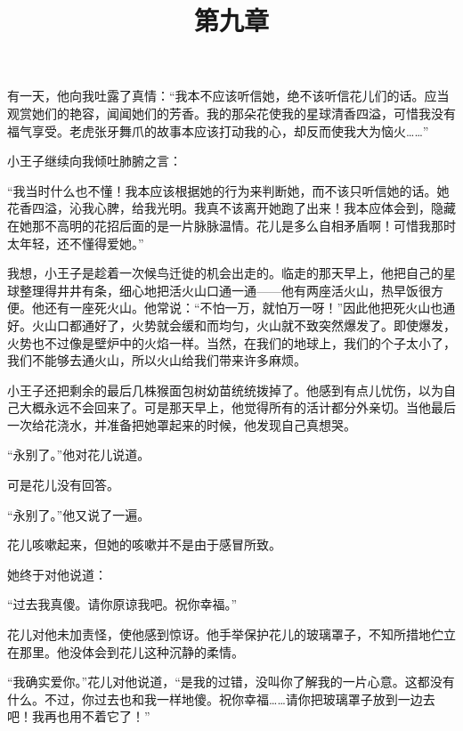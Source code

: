 有一天，他向我吐露了真情：“我本不应该听信她，绝不该听信花儿们的话。应当观赏她们的艳容，闻闻她们的芳香。我的那朵花使我的星球清香四溢，可惜我没有福气享受。老虎张牙舞爪的故事本应该打动我的心，却反而使我大为恼火\ldots{}\ldots{}”

小王子继续向我倾吐肺腑之言：

“我当时什么也不懂！我本应该根据她的行为来判断她，而不该只听信她的话。她花香四溢，沁我心脾，给我光明。我真不该离开她跑了出来！我本应体会到，隐藏在她那不高明的花招后面的是一片脉脉温情。花儿是多么自相矛盾啊！可惜我那时太年轻，还不懂得爱她。”

{\startalignment[center]
 \stopalignment}

\title{第九章}

{\startalignment[center]
 \stopalignment}

我想，小王子是趁着一次候鸟迁徙的机会出走的。临走的那天早上，他把自己的星球整理得井井有条，细心地把活火山口通一通------他有两座活火山，热早饭很方便。他还有一座死火山。他常说：“不怕一万，就怕万一呀！”因此他把死火山也通好。火山口都通好了，火势就会缓和而均匀，火山就不致突然爆发了。即使爆发，火势也不过像是壁炉中的火焰一样。当然，在我们的地球上，我们的个子太小了，我们不能够去通火山，所以火山给我们带来许多麻烦。

{\startalignment[center]
 \stopalignment}

小王子还把剩余的最后几株猴面包树幼苗统统拨掉了。他感到有点儿忧伤，以为自己大概永远不会回来了。可是那天早上，他觉得所有的活计都分外亲切。当他最后一次给花浇水，并准备把她罩起来的时候，他发现自己真想哭。

“永别了。”他对花儿说道。

可是花儿没有回答。

“永别了。”他又说了一遍。

花儿咳嗽起来，但她的咳嗽并不是由于感冒所致。

她终于对他说道：

“过去我真傻。请你原谅我吧。祝你幸福。”

花儿对他未加责怪，使他感到惊讶。他手举保护花儿的玻璃罩子，不知所措地伫立在那里。他没体会到花儿这种沉静的柔情。

“我确实爱你。”花儿对他说道，“是我的过错，没叫你了解我的一片心意。这都没有什么。不过，你过去也和我一样地傻。祝你幸福\ldots{}\ldots{}请你把玻璃罩子放到一边去吧！我再也用不着它了！”


